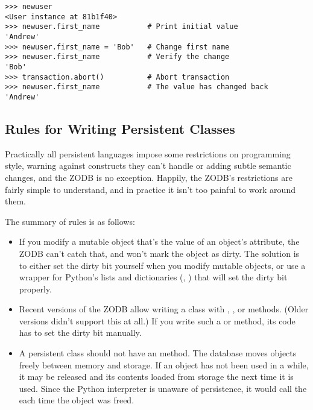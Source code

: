 \begin{verbatim}>>> newuser
<User instance at 81b1f40>
>>> newuser.first_name           # Print initial value
'Andrew'         
>>> newuser.first_name = 'Bob'   # Change first name
>>> newuser.first_name           # Verify the change
'Bob'
>>> transaction.abort()          # Abort transaction
>>> newuser.first_name           # The value has changed back
'Andrew'
\end{verbatim}

\subsection{Rules for Writing Persistent Classes}

Practically all persistent languages impose some restrictions on
programming style, warning against constructs they can't handle or
adding subtle semantic changes, and the ZODB is no exception.
Happily, the ZODB's restrictions are fairly simple to understand, and
in practice it isn't too painful to work around them.

The summary of rules is as follows:

\begin{itemize}

\item If you modify a mutable object that's the value of an object's
attribute, the ZODB can't catch that, and won't mark the object as
dirty.  The solution is to either set the dirty bit yourself when you
modify mutable objects, or use a wrapper for Python's lists and
dictionaries (,
)
that will set the dirty bit properly.

\item Recent versions of the ZODB allow writing a class with 
 , , or 
methods.  (Older versions didn't support this at all.)  If you write
such a  or  method, its code
has to set the dirty bit manually.

\item A persistent class should not have an  method.
The database moves objects freely between memory and storage.  If an
object has not been used in a while, it may be released and its
contents loaded from storage the next time it is used.  Since the
Python interpreter is unaware of persistence, it would call the
 each time the object was freed.

\end{itemize}

